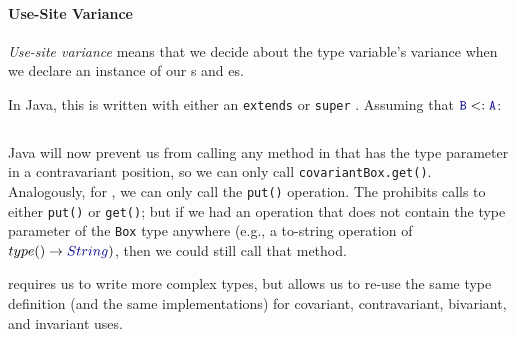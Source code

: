 \paragraph{Use-Site Variance}\label{par:Use_Site_Variance}
\begin{definition}\label{def:Use_Site_Variance}
  \emph{Use-site variance} means that we decide about the type variable's variance when we declare an instance of our s and es.
\end{definition}

In Java, this is written with either an \texttt{extends} or \texttt{super} .
Assuming that $\mathtt{\SemanticType{B}} <: \mathtt{\SemanticType{A}}$:
\inputminted[frame=lines,linenos]{scala}{./EDAP05-Concepts_Programming_Languages-Sections/Advanced_Data_Types/Code/Use_Site_Variance.java}

Java will now prevent us from calling any method in \texttt{} that has the type parameter in a contravariant position, so we can only call \texttt{covariantBox.get()}.
Analogously, for \texttt{}, we can only call the \texttt{put()} operation.
The \texttt{} prohibits calls to either \texttt{put()} or \texttt{get()}; but if we had an operation that does not contain the type parameter of the \texttt{Box} type anywhere (e.g., a to-string operation of $type () \rightarrow \SemanticType{String})$, then we could still call that method.

 requires us to write more complex types, but allows us to re-use the same type definition (and the same implementations) for covariant, contravariant, bivariant, and invariant uses.

